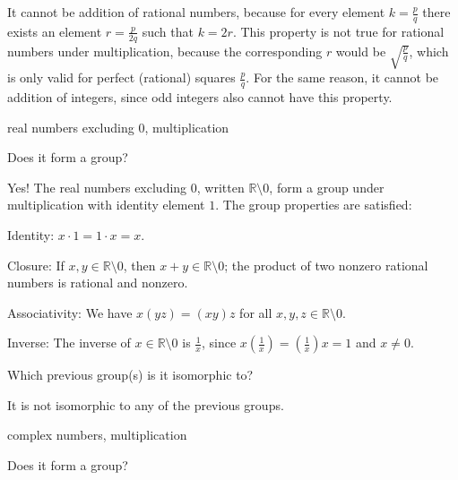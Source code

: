 \documentclass[../key.tex]{subfiles}
\begin{document}
It cannot be addition of rational numbers, because for every element $k=\frac{p}{q}$ there exists an element $r=\frac{p}{2q}$ such that $k=2r$. This property is not true for rational numbers under multiplication, because the corresponding $r$ would be $\sqrt{\frac{p}{q}}$, which is only valid for perfect (rational) squares $\frac{p}{q}$. For the same reason, it cannot be addition of integers, since odd integers also cannot have this property.

\begin{inner_problem}
\item real numbers excluding $0$, multiplication
\end{inner_problem}

\begin{iinner_problem}[start=1]
\item Does it form a group?
\end{iinner_problem}

\noindent Yes! The real numbers excluding $0$, written $\mathbb{R} \setminus {0}$, form a group under multiplication with identity element $1$. The group properties are satisfied:

Identity: $x\cdot 1=1\cdot x=x$.

Closure: If $x,y\in \mathbb{R} \setminus {0}$, then $x+y\in \mathbb{R} \setminus {0}$; the product of two nonzero rational numbers is rational and nonzero.

Associativity: We have $x(yz)=(xy)z$ for all $x,y,z \in \mathbb{R} \setminus {0}$.

Inverse: The inverse of $x\in \mathbb{R} \setminus {0}$ is $\frac{1}{x}$, since $x\left(\frac{1}{x}\right)=\left(\frac{1}{x}\right)x=1$ and $x\neq 0$.

\begin{iinner_problem}
\item Which previous group(s) is it isomorphic to?
\end{iinner_problem}

\noindent It is not isomorphic to any of the previous groups.

\begin{inner_problem}
\item complex numbers, multiplication
\end{inner_problem}

\begin{iinner_problem}[start=1]
\item Does it form a group?
\end{iinner_problem}
\end{document}
